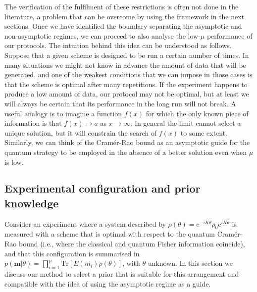 The verification of the fulfilment of these restrictions is often not done in the literature, a problem that can be overcome by using the framework in the next sections. Once we have identified the boundary separating the asymptotic and non-asymptotic regimes, we can proceed to also analyse the low-$\mu$ performance of our protocols. The intuition behind this idea can be understood as follows. Suppose that a given scheme is designed to be run a certain number of times. In many situations we might not know in advance the amount of data that will be generated, and  one of the weakest conditions that we can impose in those cases is that the scheme is optimal after many repetitions. If the experiment happens to produce a low amount of data, our protocol may not be optimal, but at least we will always be certain that its performance in the long run will not break. A useful analogy is to imagine a function $f(x)$ for which the only known piece of information is that $f(x) \rightarrow a$ as $x \rightarrow \infty$. In general the limit cannot select a unique solution, but it will constrain the search of $f(x)$ to some extent. Similarly, we can think of the Cram\'{e}r-Rao bound as an asymptotic guide for the quantum strategy to be employed in the absence of a better solution even when $\mu$ is low.

\subsection{Experimental configuration and prior knowledge}
\label{experiment_prior}

Consider an experiment where a system described by $\rho(\theta) = \mathrm{e}^{-i K\theta}\rho_0 \mathrm{e}^{i K\theta}$ is measured with a scheme that is optimal with respect to the quantum Cram\'{e}r-Rao bound (i.e., where the classical and quantum Fisher information coincide), and that this configuration is summarised in $p(\boldsymbol{m}|\theta)=\prod_{i=1}^\mu\mathrm{Tr}[E(m_i)\rho(\theta)]$, with $\theta$ unknown. In this section we discuss our method to select a prior that is suitable for this arrangement and compatible with the idea of using the asymptotic regime as a guide.


